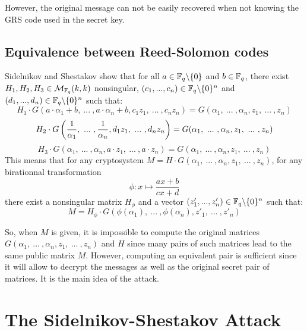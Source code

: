 \documentclass[a4paper]{article}
\begin{document}
However, the original message can not be easily recovered when not knowing the GRS code used in the secret key.

\subsection{Equivalence between Reed-Solomon codes}

Sidelnikov and Shestakov show \cite{SidelShes92} that for all $a \in \mathbb{F}_q\backslash\{0\}$ and $b \in \mathbb{F}_q$, there exist $H_1, H_2, H_3 \in \mathcal{M}_{\mathbb{F}_q}(k,k)$ nonsingular, $(c_1,... ,c_n) \in \mathbb{F}_q\backslash\{0\}^{n}$ and $(d_1,... ,d_n) \in \mathbb{F}_q\backslash\{0\}^{n}$ such that:
\begin{equation}
H_1\cdot G(a\cdot\alpha_1 + b, \ ... \ , a\cdot \alpha_n + b, c_1z_1, \ ... \ , c_n z_n) = G(\alpha_1, \ ... \ , \alpha_n, z_1, \ ... \ , z_n)
\label{eq1}
\end{equation}
\begin{equation}
H_2\cdot G\left( \frac{1}{\alpha_1}, \ ... \ , \frac{1}{\alpha_n}, d_1z_1, \ ... \ , d_n z_n \right) = G(\alpha_1, \ ... \ , \alpha_n, z_1, \ ... \ , z_n) \\
\label{eq2}
\end{equation}
\begin{equation}
H_3\cdot G\left( \alpha_1, \ ... \ , \alpha_n, a\cdot z_1, \ ... \ , a\cdot z_n \right) = G(\alpha_1, \ ... \ , \alpha_n, z_1, \ ... \ , z_n)
\label{eq3}
\end{equation}
This means that for any cryptosystem $M = H\cdot G(\alpha_1, \ ... \ , \alpha_n, z_1, \ ... \ , z_n)$, for any birationnal transformation
$$ \phi : x \mapsto \frac{ax+b}{cx+d}$$
there exist a nonsingular matrix $H_{\phi}$ and a vector $(z'_1,... ,z'_n) \in \mathbb{F}_q\backslash\{0\}^{n}$ such that:
\begin{equation}
 M = H_{\phi}\cdot G(\phi(\alpha_1), \ ... \ , \phi(\alpha_n), z'_1, \ ... \ , z'_n)
 \label{eq4}
\end{equation}


So, when $M$ is given, it is impossible to compute the original matrices $G(\alpha_1, \ ... \ , \alpha_n, z_1, \ ... \ , z_n)$ and $H$ since many pairs of such matrices lead to the same public matrix $M$.
However, computing an equivalent pair is sufficient since it will allow to decrypt the messages as well as the original secret pair of matrices.
It is the main idea of the attack.



\newpage
\section{The Sidelnikov-Shestakov Attack}
\label{sec:SSattack}
\end{document}
